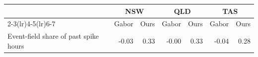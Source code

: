 \begin{tabular}{lrrrrrr}
\toprule
& \multicolumn{2}{c}{NSW} & \multicolumn{2}{c}{QLD} & \multicolumn{2}{c}{TAS} \\
\cmidrule(lr){2-3}\cmidrule(lr){4-5}\cmidrule(lr){6-7}
& Gabor & Ours & Gabor & Ours & Gabor & Ours \\
\midrule
Event-field share of past spike hours & -0.03 & 0.33 & -0.00 & 0.33 & -0.04 & 0.28 \\
\bottomrule
\end{tabular}
